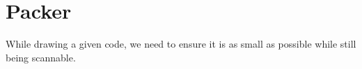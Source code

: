 \section{Packer}

While drawing a given code, we need to ensure it is as small as possible while still being scannable.
